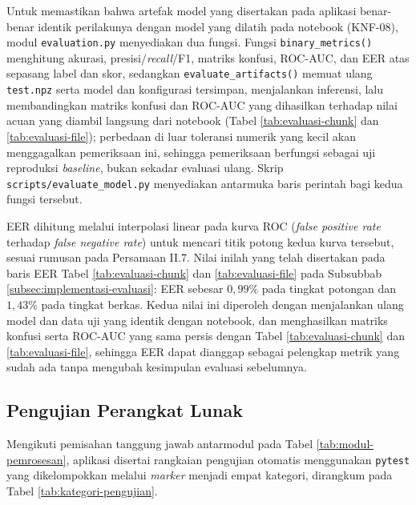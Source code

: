 Untuk memastikan bahwa artefak model yang disertakan pada aplikasi benar-benar
identik perilakunya dengan model yang dilatih pada notebook (KNF-08), modul
\texttt{evaluation.py} menyediakan dua fungsi. Fungsi \texttt{binary\_metrics()}
menghitung akurasi, presisi/\textit{recall}/F1, matriks konfusi, ROC-AUC, dan
EER atas sepasang label dan skor, sedangkan \texttt{evaluate\_artifacts()}
memuat ulang \texttt{test.npz} serta model dan konfigurasi tersimpan, menjalankan
inferensi, lalu membandingkan matriks konfusi dan ROC-AUC yang dihasilkan
terhadap nilai acuan yang diambil langsung dari notebook (Tabel
\ref{tab:evaluasi-chunk} dan \ref{tab:evaluasi-file}); perbedaan di luar
toleransi numerik yang kecil akan menggagalkan pemeriksaan ini, sehingga
pemeriksaan berfungsi sebagai uji reproduksi \textit{baseline}, bukan sekadar
evaluasi ulang. Skrip \texttt{scripts/evaluate\_model.py} menyediakan antarmuka
baris perintah bagi kedua fungsi tersebut.

EER dihitung melalui interpolasi linear pada kurva ROC (\textit{false positive
rate} terhadap \textit{false negative rate}) untuk mencari titik potong kedua
kurva tersebut, sesuai rumusan pada Persamaan II.7. Nilai inilah yang telah
disertakan pada baris EER Tabel \ref{tab:evaluasi-chunk} dan
\ref{tab:evaluasi-file} pada Subsubbab \ref{subsec:implementasi-evaluasi}: EER
sebesar $0{,}99\%$ pada tingkat potongan dan $1{,}43\%$ pada tingkat berkas.
Kedua nilai ini diperoleh dengan menjalankan ulang model dan data uji yang
identik dengan notebook, dan menghasilkan matriks konfusi serta ROC-AUC yang
sama persis dengan Tabel \ref{tab:evaluasi-chunk} dan \ref{tab:evaluasi-file},
sehingga EER dapat dianggap sebagai pelengkap metrik yang sudah ada tanpa
mengubah kesimpulan evaluasi sebelumnya.

\subsection{Pengujian Perangkat Lunak}
\label{subsec:implementasi-pengujian}

Mengikuti pemisahan tanggung jawab antarmodul pada Tabel
\ref{tab:modul-pemrosesan}, aplikasi disertai rangkaian pengujian otomatis
menggunakan \texttt{pytest} yang dikelompokkan melalui \textit{marker} menjadi
empat kategori, dirangkum pada Tabel \ref{tab:kategori-pengujian}.

